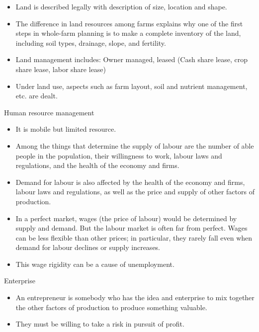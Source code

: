 \documentclass[12pt,ignorenonframetext,aspectratio=169]{beamer}
\providecommand{\tightlist}{%
  \setlength{\itemsep}{0pt}\setlength{\parskip}{0pt}}
\begin{document}
\begin{frame}{}
\protect\hypertarget{section-4}{}

\begin{itemize}
\tightlist
\item
  Land is described legally with description of size, location and
  shape.
\item
  The difference in land resources among farms explains why one of the
  first steps in whole-farm planning is to make a complete inventory of
  the land, including soil types, drainage, slope, and fertility.
\item
  Land management includes: Owner managed, leased (Cash share lease,
  crop share lease, labor share lease)
\item
  Under land use, aspects such as farm layout, soil and nutrient
  management, etc. are dealt.
\end{itemize}

\end{frame}

\begin{frame}{Human resource management}
\protect\hypertarget{human-resource-management}{}

\begin{itemize}
\tightlist
\item
  It is mobile but limited resource.
\item
  Among the things that determine the supply of labour are the number of
  able people in the population, their willingness to work, labour laws
  and regulations, and the health of the economy and firms.
\item
  Demand for labour is also affected by the health of the economy and
  firms, labour laws and regulations, as well as the price and supply of
  other factors of production.
\item
  In a perfect market, wages (the price of labour) would be determined
  by supply and demand. But the labour market is often far from perfect.
  Wages can be less flexible than other prices; in particular, they
  rarely fall even when demand for labour declines or supply increases.
\item
  This wage rigidity can be a cause of unemployment.
\end{itemize}

\end{frame}

\begin{frame}{Enterprise}
\protect\hypertarget{enterprise}{}

\begin{itemize}
\tightlist
\item
  An entrepreneur is somebody who has the idea and enterprise to mix
  together the other factors of production to produce something
  valuable.
\item
  They must be willing to take a risk in pursuit of profit.
\end{itemize}

\end{frame}
\end{document}
